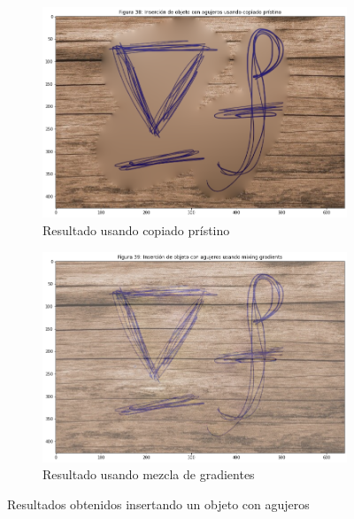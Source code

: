 \documentclass[11pt,twoside,titlepage,a4paper]{article}
\numberwithin{equation}{section} %
\theoremstyle{usual}
\begin{document}
\begin{figure}[h]
    \centering
    \begin{subfigure}[b]{.5\textwidth}
        \centering
        \includegraphics[width=\textwidth]{imagenes/PoissonImageEditing_cell_50_output_0.png}
        \caption{Resultado usando copiado prístino}
        \label{fig:resultadoAgujerosCopiadoPristino}
    \end{subfigure}%
    \begin{subfigure}[b]{.5\textwidth}
        \centering
        \includegraphics[width=\textwidth]{imagenes/PoissonImageEditing_cell_50_output_1.png}
        \caption{Resultado usando mezcla de gradientes}
        \label{fig:resultadoAgujerosMixingGradients}
    \end{subfigure}
    \caption{Resultados obtenidos insertando un objeto con agujeros}
    \label{fig:resultadosInsercionAgujeros}
\end{figure}
\end{document}
